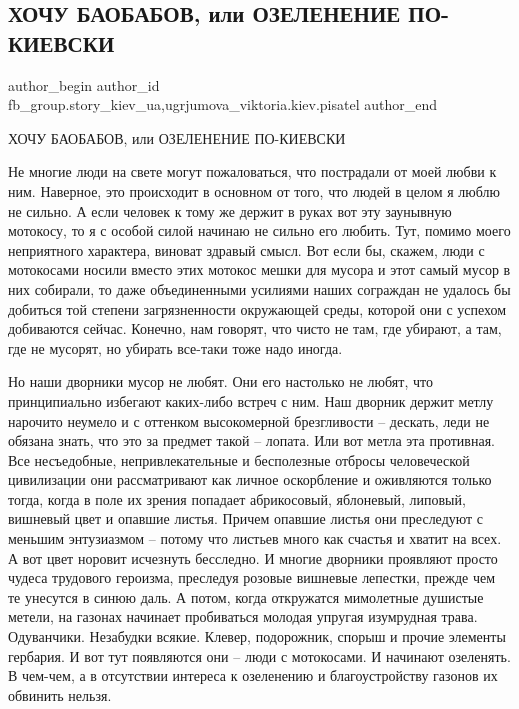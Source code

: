  
 
 
 
 
 
\subsection{ХОЧУ БАОБАБОВ, или ОЗЕЛЕНЕНИЕ ПО-КИЕВСКИ}
\label{sec:11_05_2021.fb.fb_group.story_kiev_ua.1.hochu_baobabov}
 
\ifcmt
 author_begin
   author_id fb_group.story_kiev_ua,ugrjumova_viktoria.kiev.pisatel
 author_end
\fi

ХОЧУ БАОБАБОВ, или ОЗЕЛЕНЕНИЕ ПО-КИЕВСКИ

Не многие люди на свете могут пожаловаться, что пострадали от моей любви к ним.
Наверное, это происходит в основном от того, что людей в целом я люблю не
сильно. А если человек к тому же держит в руках вот эту заунывную мотокосу, то
я с особой силой начинаю не сильно его любить. Тут, помимо моего неприятного
характера, виноват здравый смысл. Вот если бы, скажем, люди с мотокосами носили
вместо этих мотокос мешки для мусора и этот самый мусор в них собирали, то даже
объединенными усилиями наших сограждан не удалось бы добиться той степени
загрязненности окружающей среды, которой они с успехом добиваются сейчас.
Конечно, нам говорят, что чисто не там, где убирают, а там, где не мусорят, но
убирать все-таки тоже надо иногда.


Но наши дворники мусор не любят. Они его настолько не любят, что принципиально
избегают каких-либо встреч с ним. Наш дворник держит метлу нарочито неумело и с
оттенком высокомерной брезгливости – дескать, леди не обязана знать, что это за
предмет такой – лопата. Или вот метла эта противная. Все несъедобные,
непривлекательные и бесполезные отбросы человеческой цивилизации они
рассматривают как личное оскорбление и оживляются только тогда, когда в поле их
зрения попадает абрикосовый, яблоневый, липовый, вишневый цвет и опавшие
листья. Причем опавшие листья они преследуют с меньшим энтузиазмом – потому что
листьев много как счастья и хватит на всех. А вот цвет норовит исчезнуть
бесследно. И многие дворники проявляют просто чудеса трудового героизма,
преследуя розовые вишневые лепестки, прежде чем те унесутся в синюю даль. А
потом, когда откружатся мимолетные душистые метели, на газонах начинает
пробиваться молодая упругая изумрудная трава. Одуванчики. Незабудки всякие.
Клевер, подорожник, спорыш и прочие элементы гербария. И вот тут появляются они
– люди с мотокосами. И начинают озеленять. В чем-чем, а в отсутствии интереса к
озеленению и благоустройству газонов их обвинить нельзя. 


